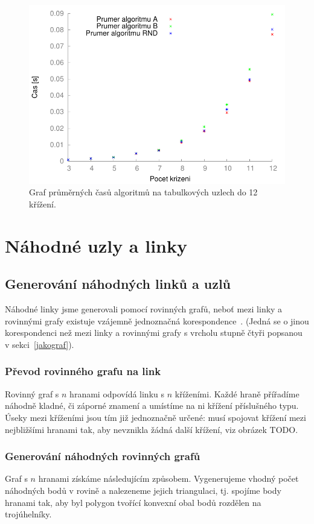 \begin{figure}[p]\centering
\includegraphics{../img/srovTable}
\caption{Graf průměrných časů algoritmů na tabulkových uzlech do 12 křížení.}
\label{obr03:srovTable}
\end{figure}


\section{Náhodné uzly a linky}

\subsection{Generování náhodných linků a uzlů}
Náhodné linky jsme generovali pomocí rovinných grafů, neboť mezi linky a rovinnými grafy existuje vzájemně jednoznačná korespondence~\cite{Adams2004}. (Jedná se o jinou korespondenci než mezi linky a rovinnými grafy s vrcholu stupně čtyři popsanou v sekci~\ref{jakograf}).

\subsubsection{Převod rovinného grafu na link}
Rovinný graf s $n$ hranami odpovídá linku s $n$ kříženími. Každé hraně přířadíme náhodně kladné, či záporné znamení a umístíme na ni křížení příslušného typu. Úseky mezi kříženími jsou tím již jednoznačně určené: musí spojovat křížení mezi nejbližšími hranami tak, aby nevznikla žádná další křížení, viz obrázek TODO.

\subsubsection{Generování náhodných rovinných grafů}
Graf s $n$ hranami získáme následujícím způsobem. Vygenerujeme vhodný počet náhodných bodů v rovině a nalezeneme jejich triangulaci, tj. spojíme body hranami tak, aby byl polygon tvořící konvexní obal bodů rozdělen na trojúhelníky.

